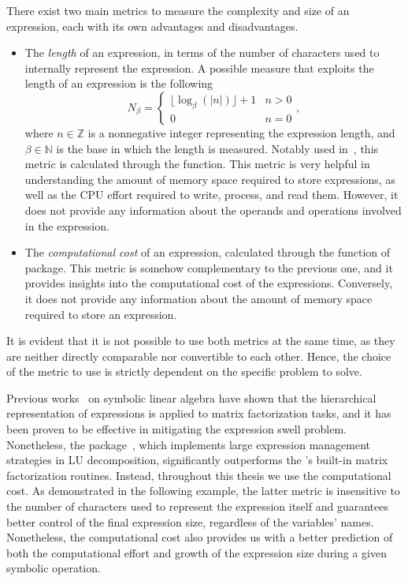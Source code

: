 There exist two main metrics to measure the complexity and size of an expression, each with its own advantages and disadvantages.
%
\begin{itemize}
  \setlength\itemsep{0em}
  \item The \emph{length} of an expression, in terms of the number of characters used to internally represent the expression. A possible measure that exploits the length of an expression is the following
  \begin{equation*}
    N_\beta = \begin{cases}
      \lfloor\log_{\beta}(|n|)\rfloor + 1 & n > 0 \\
      0 & n = 0
    \end{cases},
  \end{equation*}
  where $n \in \mathbb{Z}$ is a nonnegative integer representing the expression length, and $\beta \in \mathbb{N}$ is the base in which the length is measured.
  Notably used in~\cite{carette2006linear, zhou2006hierarchical}, this metric is calculated through the  \Maple{} function. This metric is very helpful in understanding the amount of memory space required to store expressions, as well as the \ac{CPU} effort required to write, process, and read them. However, it does not provide any information about the operands and operations involved in the expression.
  \item The \emph{computational cost} of an expression, calculated through the  function of  package. This metric is somehow complementary to the previous one, and it provides insights into the computational cost of the expressions. Conversely, it does not provide any information about the amount of memory space required to store an expression.
\end{itemize}
%
It is evident that it is not possible to use both metrics at the same time, as they are neither directly comparable nor convertible to each other. Hence, the choice of the metric to use is strictly dependent on the specific problem to solve.

Previous works~\cite{carette2006linear, zhou2006hierarchical} on symbolic linear algebra have shown that the hierarchical representation of expressions is applied to matrix factorization tasks, and it has been proven to be effective in mitigating the expression swell problem. Nonetheless, the \LULEM{} package~\cite{carette2006linear}, which implements large expression management strategies in \ac{LU} decomposition, significantly outperforms the \Maple{}'s built-in matrix factorization routines. Instead, throughout this thesis we use the computational cost. As demonstrated in the following example, the latter metric is insensitive to the number of characters used to represent the expression itself and guarantees better control of the final expression size, regardless of the variables' names. Nonetheless, the computational cost also provides us with a better prediction of both the computational effort and growth of the expression size during a given symbolic operation.

